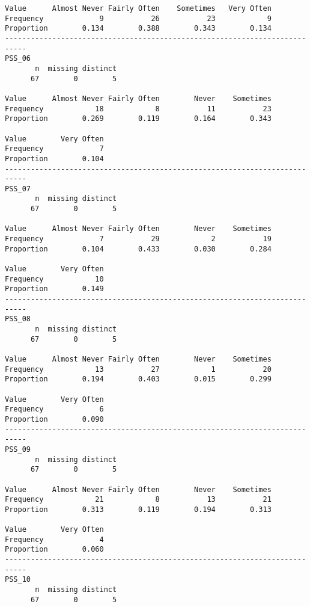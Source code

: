 \documentclass[]{article}
\begin{document}
\begin{verbatim}
Value      Almost Never Fairly Often    Sometimes   Very Often
Frequency             9           26           23            9
Proportion        0.134        0.388        0.343        0.134
---------------------------------------------------------------------------
PSS_06 
       n  missing distinct 
      67        0        5 
                                                              
Value      Almost Never Fairly Often        Never    Sometimes
Frequency            18            8           11           23
Proportion        0.269        0.119        0.164        0.343
                       
Value        Very Often
Frequency             7
Proportion        0.104
---------------------------------------------------------------------------
PSS_07 
       n  missing distinct 
      67        0        5 
                                                              
Value      Almost Never Fairly Often        Never    Sometimes
Frequency             7           29            2           19
Proportion        0.104        0.433        0.030        0.284
                       
Value        Very Often
Frequency            10
Proportion        0.149
---------------------------------------------------------------------------
PSS_08 
       n  missing distinct 
      67        0        5 
                                                              
Value      Almost Never Fairly Often        Never    Sometimes
Frequency            13           27            1           20
Proportion        0.194        0.403        0.015        0.299
                       
Value        Very Often
Frequency             6
Proportion        0.090
---------------------------------------------------------------------------
PSS_09 
       n  missing distinct 
      67        0        5 
                                                              
Value      Almost Never Fairly Often        Never    Sometimes
Frequency            21            8           13           21
Proportion        0.313        0.119        0.194        0.313
                       
Value        Very Often
Frequency             4
Proportion        0.060
---------------------------------------------------------------------------
PSS_10 
       n  missing distinct 
      67        0        5 
                                                              

\end{verbatim}
\end{document}
